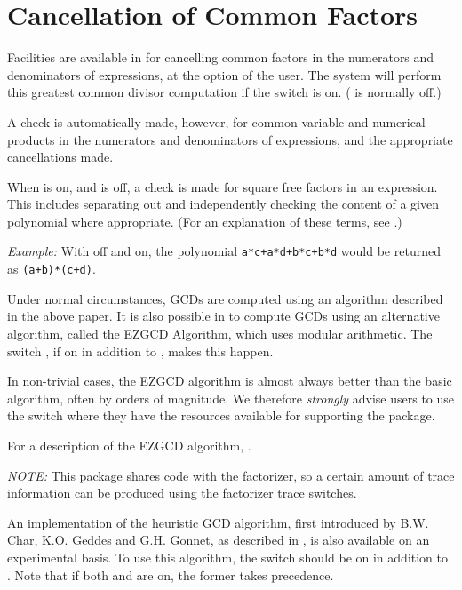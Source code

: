 \section{Cancellation of Common Factors}
\hypertarget{switch:GCD}{}
Facilities are available in {\REDUCE} for cancelling common factors in the
numerators and denominators of expressions, at the option of the user. The
system will perform this greatest common divisor computation if the switch
 is on. ( is normally off.)

A check is automatically made, however, for common variable and numerical
products in the numerators and denominators of expressions, and the
appropriate cancellations made.

When  is on, and  is off, a check is made for square
free factors in an expression.  This includes separating out and
independently checking the content of a given polynomial where
appropriate. (For an explanation of these terms, see \cite{Hearn:79}.)

\textit{Example:} With  off and 
on,
the polynomial \texttt{a*c+a*d+b*c+b*d} would be returned as \texttt{(a+b)*(c+d)}.

\hypertarget{switch:EZGCD}{}
Under normal circumstances, GCDs are computed using an algorithm described
in the above paper. It is also possible in {\REDUCE} to compute GCDs using
an alternative algorithm, called the EZGCD Algorithm, which uses modular
arithmetic.  The switch , if on in addition to
, makes this happen.

In non-trivial cases, the EZGCD algorithm is almost always better
than the basic algorithm, often by orders of magnitude.  We therefore
\emph{strongly} advise users to use the  switch where they have the
resources available for supporting the package.

For a description of the EZGCD algorithm, \cite{Moses1973TheEG}.

\textit{NOTE:}
This package shares code with the factorizer, so a certain amount of trace
information can be produced using the factorizer trace switches.

\hypertarget{switch:HEUGCD}{}
An implementation of the heuristic GCD algorithm, first introduced by B.W.
Char, K.O.  Geddes and G.H.  Gonnet, as described in \cite{Davenport:85}, is also available on an
experimental basis.  To use this algorithm, the switch 
should be on in addition to .  Note that
if both  and  are on, the former takes precedence.


